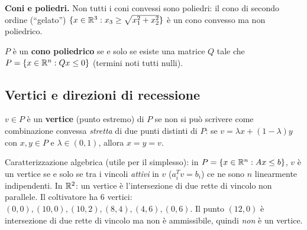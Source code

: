 \textbf{Coni e poliedri.} Non tutti i coni convessi sono poliedri: il cono di secondo ordine (``gelato'') $\{x\in\mathbb{R}^3: x_3\ge\sqrt{x_1^2+x_2^2}\}$ è un cono convesso ma non poliedrico.
\begin{prop}
$P$ è un \textbf{cono poliedrico} se e solo se esiste una matrice $Q$ tale che $P=\{x\in\mathbb{R}^n: Qx\le0\}$ (termini noti tutti nulli).
\end{prop}

\subsection{Vertici e direzioni di recessione}
\begin{defbox}[vertice]
$v\in P$ è un \textbf{vertice} (punto estremo) di $P$ se non si può scrivere come combinazione convessa \emph{stretta} di due punti distinti di $P$: se $v=\lambda x+(1-\lambda)y$ con $x,y\in P$ e $\lambda\in(0,1)$, allora $x=y=v$.
\end{defbox}
Caratterizzazione algebrica (utile per il simplesso): in $P=\{x\in\mathbb{R}^n:Ax\le b\}$, $v$ è un vertice se e solo se tra i vincoli \emph{attivi} in $v$ ($a_i^Tv=b_i$) ce ne sono $n$ linearmente indipendenti. In $\mathbb{R}^2$: un vertice è l'intersezione di due rette di vincolo non parallele. Il coltivatore ha 6 vertici: $(0,0),(10,0),(10,2),(8,4),(4,6),(0,6)$. Il punto $(12,0)$ è intersezione di due rette di vincolo ma non è ammissibile, quindi \emph{non} è un vertice.

\begin{center}
\end{center}

